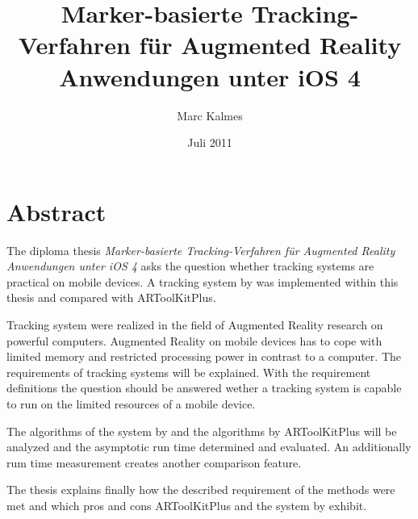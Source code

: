 %
%




\frontmatter

\ifpdf
{}
\else
{}
\fi

\titlehead{Fachhochschule Köln\\ Fakultät für Informatik und Ingenieurwissenschaften}
\subject{Diplomarbeit}
\title{Marker-basierte Tracking-Verfahren für Augmented Reality Anwendungen unter iOS 4}
\author{Marc Kalmes}
\date{Juli 2011}
\publishers{betreut durch Prof. Dr. Heiner Klocke}

\maketitle

\tableofcontents

\chapter*{Abstract} %
\label{cha:abstract}
The diploma thesis \emph{Marker-basierte Tracking-Verfahren für Augmented Reality Anwendungen unter iOS 4} asks the question whether tracking systems are practical on mobile devices. A tracking system by \citeauthor{hirzer08} was implemented within this thesis and compared with ARToolKitPlus.

Tracking system were realized in the field of Augmented Reality research on powerful computers. Augmented Reality on mobile devices has to cope with limited memory and restricted processing power in contrast to a computer. The requirements of tracking systems will be explained. With the requirement definitions the question should be answered wether a tracking system is capable to run on the limited resources of a mobile device.

The algorithms of the system by \citeauthor{hirzer08} and the algorithms by ARToolKitPlus will be analyzed and the asymptotic run time determined and evaluated. An additionally rum time measurement creates another comparison feature.

The thesis explains finally how the described requirement of the methods were met and which pros and cons ARToolKitPlus and the system by \citeauthor{hirzer08} exhibit.

